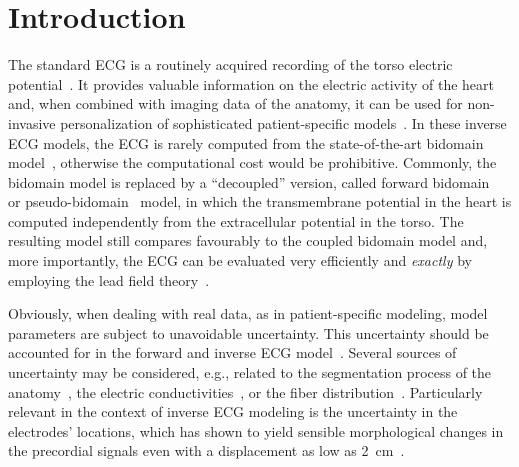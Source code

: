 \documentclass[runningheads]{llncs}
\begin{document}
\section{Introduction}
The standard ECG is a routinely acquired recording of the torso electric
potential~\cite{plonsey95}. 
It provides valuable information on the electric activity
of the heart and, when combined with imaging data of the anatomy,
it can be used for non-invasive personalization of sophisticated
patient-specific models~\cite{GiffardRoisin2019,Pezzuto2021}.
In these inverse ECG models, the ECG is rarely computed from the state-of-the-art
bidomain model~\cite{colli2014}, otherwise the computational cost would be prohibitive. Commonly,
the bidomain model is replaced by a ``decoupled'' version, called
forward bidomain~\cite{potse2006} or pseudo-bidomain~\cite{bishop2011,neic2017} model,
in which the transmembrane potential in the heart is computed independently
from the extracellular potential in the torso.
The resulting model still compares favourably to the coupled bidomain model and,
more importantly, the ECG can be evaluated
very efficiently and \emph{exactly} by employing the lead field theory~\cite{pezzuto2017,potse2018}.

Obviously, when dealing with real data, as in patient-specific modeling,
model parameters are subject to unavoidable uncertainty. This uncertainty
should be accounted for
in the forward and inverse ECG model~\cite{clayton2020}.
Several sources of
uncertainty may be considered, e.g., related to the segmentation
process of the anatomy~\cite{corrado2020},
the electric conductivities~\cite{aboulaich2016},
or the fiber distribution~\cite{Quaglino2018}.
Particularly relevant in the context of inverse ECG modeling
is the uncertainty in the electrodes' locations, which has shown
to yield sensible morphological changes in the precordial signals
even with a displacement as low as \SI{2}{\cm}~\cite{kania2014}.
\end{document}
